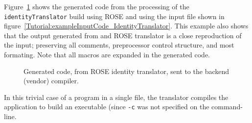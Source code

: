 Figure~\ref{Tutorial:exampleOutputFromTranslator} shows the generated code from the
processing of the {\tt identityTranslator} build using ROSE and using the input file
shown in figure~\ref{Tutorial:exampleInputCode_IdentityTranslator}.
This example also shows that the output generated from and ROSE translator is
a close reproduction of the input; preserving all comments, preprocessor
control structure, and most formating.  Note that all macros are expanded in
the generated code.

\begin{figure}[!h]
{\indent
{\mySmallFontSize


\begin{latexonly}
   
\end{latexonly}

\begin{htmlonly}
   
\end{htmlonly}

}
}
\caption{Generated code, from ROSE identity translator, sent to the backend (vendor) compiler.}
\label{Tutorial:exampleOutputFromTranslator}
\end{figure}

  In this trivial case of a program in a single file, the translator
compiles the application to build an executable (since {\tt -c}
was not specified on the command-line.




